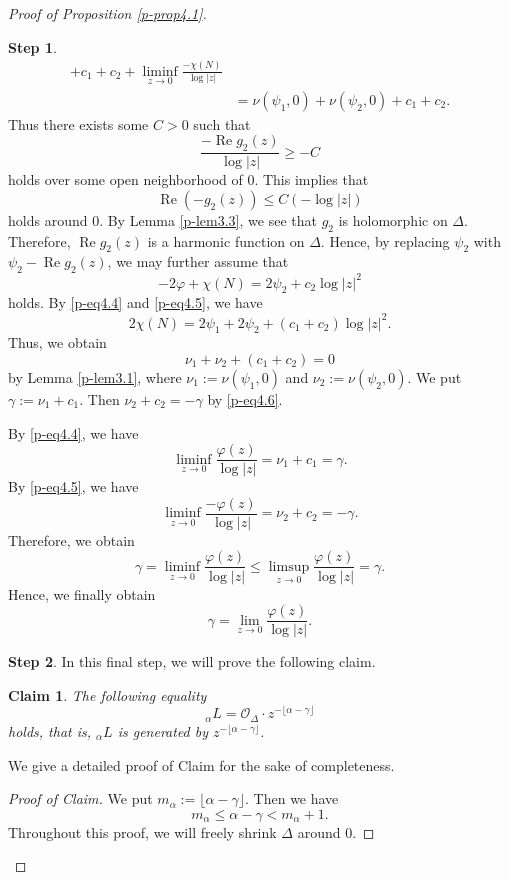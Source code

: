 \documentclass[12pt,twoside]{amsart}
\DeclareMathOperator{\re}{Re}
\newtheorem*{claim}{Claim}
\theoremstyle{definition}
\newtheorem{step}{Step}
\begin{document}
\begin{proof}[Proof of Proposition \ref{p-prop4.1}]
\begin{step}
\[\begin{split}
+c_1+c_2
+\liminf_{z\to 0}\frac{-\chi(N)}{\log|z|}
\\ &=\nu(\psi_1, 0)+\nu(\psi_2, 0)+c_1+c_2. 
\end{split}
\] 
Thus there exists some $C>0$ such that 
\[
\frac{-\re g_2(z)}{\log |z|}\geq -C
\] 
holds over some open neighborhood of $0$. 
This implies that 
\[
\re\left(-g_2(z)\right)\leq C\left(-\log |z|\right)
\] 
holds around $0$. 
By Lemma \ref{p-lem3.3}, we see that 
$g_2$ is holomorphic on $\Delta$. 
Therefore, $\re g_2(z)$ is a harmonic function on $\Delta$. 
Hence, by replacing $\psi_2$ with $\psi_2-\re g_2(z)$, 
we may further assume that  
\begin{equation}\label{p-eq4.5}
-2\varphi +\chi (N)=2\psi_2+c_2\log |z|^2
\end{equation} 
holds. By \eqref{p-eq4.4} and \eqref{p-eq4.5}, 
we have 
\[
2\chi (N)=2\psi_1+2\psi_2+(c_1+c_2)\log |z|^2. 
\] 
Thus, we obtain 
\begin{equation}\label{p-eq4.6}
\nu_1+\nu _2+(c_1+c_2)=0 
\end{equation} 
by Lemma \ref{p-lem3.1}, 
where $\nu_1:=\nu (\psi_1, 0)$ and $\nu_2:=\nu(\psi_2, 0)$. 
We put $\gamma:=\nu_1+c_1$. 
Then $\nu_2+c_2 =-\gamma$ by \eqref{p-eq4.6}. 

By \eqref{p-eq4.4}, we have 
\[
\liminf_{z\to 0} \frac{\varphi(z)}{\log |z|} =\nu_1+c_1=\gamma. 
\]
By 
\eqref{p-eq4.5}, we have 
\[
\liminf_{z\to 0} \frac{-\varphi(z)}{\log |z|} =\nu_2+c_2=-\gamma. 
\]
Therefore, we obtain 
\[
\gamma =\liminf_{z\to 0} \frac{\varphi(z)}{\log |z|} 
\leq \limsup_{z\to 0} \frac{\varphi(z)}{\log |z|} =\gamma. 
\] 
Hence, we finally obtain 
\begin{equation}\label{p-eq4.7}
\gamma =\lim_{z\to 0} \frac{\varphi(z)}{\log |z|}. 
\end{equation} 
\end{step} 

\begin{step}\label{p-step4.1-6} 
In this final step, we will prove the following claim. 

\begin{claim}\label{p-claim} 
The following equality 
\[
{}_\alpha L=\mathcal O_\Delta\cdot z^{-\lfloor \alpha -\gamma\rfloor}
\] 
holds, that is, ${}_\alpha L$ is generated by 
$z^{-\lfloor \alpha -\gamma \rfloor}$. 
\end{claim}
We give a detailed proof of Claim for the sake of completeness. 
\begin{proof}[Proof of Claim] 
We put 
$m_\alpha :=\lfloor \alpha -\gamma\rfloor$. 
Then we have 
\[
m_\alpha \leq \alpha -\gamma <m_\alpha +1. 
\] 
Throughout this proof, we will freely shrink $\Delta$ around $0$. 


\end{proof}
\end{step}
\end{proof}
\end{document}
